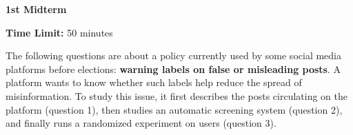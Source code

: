 \documentclass[11pt]{exam}
\newcommand{\exam}{1st Midterm}
\begin{document}
\begin{center}

    {\Huge \textbf{\exam{}}}
    \vspace{0.7cm}

    \begin{flushright}
        \textbf{Time Limit:} 50 minutes
    \end{flushright}
    \vspace{-0.2cm}

\end{center}

\vspace{0.3cm}

The following questions are about a policy currently used by some social media platforms before elections:
\textbf{warning labels on false or misleading posts}. A platform wants to know whether such labels help reduce the spread of misinformation. To study this issue, it first describes the posts circulating on the platform (question 1), then studies an automatic screening system (question 2), and finally runs a randomized experiment on users (question 3).
\vspace{0.2cm}
\end{document}
